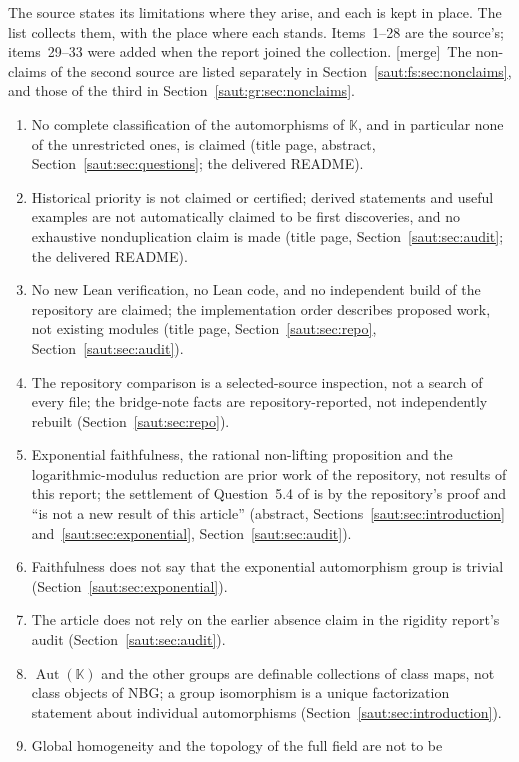 \documentclass[11pt]{article}
\theoremstyle{definition}
\theoremstyle{remark}
\newcommand{\K}{\mathbb K}
\newcommand{\Aut}{\operatorname{Aut}}
\newcommand{\mergetag}{\textup{[merge]}}
\numberwithin{equation}{section}
\begin{document}
The source states its limitations where they arise, and each is kept in
place. The list collects them, with the place where each stands.
Items~1--28 are the source's; items~29--33 were added when the report
joined the collection. \mergetag\ The non-claims of the second source are listed
separately in Section~\ref{saut:fs:sec:nonclaims}, and those of the third in
Section~\ref{saut:gr:sec:nonclaims}.
\begin{enumerate}[label=\arabic*.,leftmargin=2.2em]
\item No complete classification of the automorphisms of $\K$, and in
particular none of the unrestricted ones, is claimed (title page, abstract,
Section~\ref{saut:sec:questions}; the delivered README).
\item Historical priority is not claimed or certified; derived statements
and useful examples are not automatically claimed to be first discoveries,
and no exhaustive nonduplication claim is made (title page,
Section~\ref{saut:sec:audit}; the delivered README).
\item No new Lean verification, no Lean code, and no independent build of
the repository are claimed; the implementation order describes proposed
work, not existing modules (title page, Section~\ref{saut:sec:repo},
Section~\ref{saut:sec:audit}).
\item The repository comparison is a selected-source inspection, not a
search of every file; the bridge-note facts are repository-reported, not
independently rebuilt (Section~\ref{saut:sec:repo}).
\item Exponential faithfulness, the rational non-lifting proposition and
the logarithmic-modulus reduction are prior work of the repository, not
results of this report; the settlement of Question~5.4 of \cite{KKS} is by
the repository's proof and ``is not a new result of this article''
(abstract, Sections~\ref{saut:sec:introduction}
and~\ref{saut:sec:exponential}, Section~\ref{saut:sec:audit}).
\item Faithfulness does not say that the exponential automorphism group is
trivial (Section~\ref{saut:sec:exponential}).
\item The article does not rely on the earlier absence claim in the
rigidity report's audit (Section~\ref{saut:sec:audit}).
\item $\Aut(\K)$ and the other groups are definable collections of class
maps, not class objects of NBG; a group isomorphism is a unique
factorization statement about individual automorphisms
(Section~\ref{saut:sec:introduction}).
\item Global homogeneity and the topology of the full field are not to be

\end{enumerate}
\end{document}
